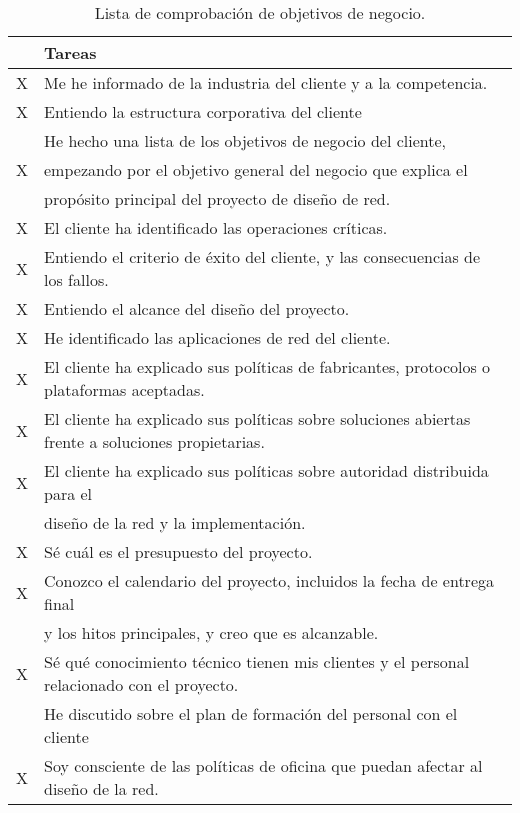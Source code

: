 \begin{table}[H]
	\begin{center}
		\begin{tabular}{|c|l|}
			\hline 
			 & Tareas  \\ 
			\hline \hline
			 X & Me he informado de la industria del cliente y a la competencia.  \\ \hline
			 X & Entiendo la estructura corporativa del cliente  \\ \hline
			  & He hecho una lista de los objetivos de negocio del cliente, \\
			 X & empezando por el objetivo general del negocio que explica el \\ 
			  & propósito principal del proyecto de diseño de red.  \\ \hline
			 X & El cliente ha identificado las operaciones críticas. \\ \hline
			 X & Entiendo el criterio de éxito del cliente, y las consecuencias de los
			 fallos.  \\ \hline
			 X & Entiendo el alcance del diseño del proyecto.  \\ \hline
			 X & He identificado las aplicaciones de red del cliente.  \\ \hline
			 X & El cliente ha explicado sus políticas de fabricantes, protocolos o
			 plataformas aceptadas.  \\ \hline
			 X & El cliente ha explicado sus políticas sobre soluciones abiertas frente a
			 soluciones propietarias.  \\ \hline
			 X & El cliente ha explicado sus políticas sobre autoridad distribuida para el \\
			 & diseño de la red y la implementación.  \\ \hline
			 X & Sé cuál es el presupuesto del proyecto.  \\ \hline
			 X & Conozco el calendario del proyecto, incluidos la fecha de entrega final \\
			 & y los hitos principales, y creo que es alcanzable.  \\ \hline
			 X & Sé qué conocimiento técnico tienen mis clientes y el personal
			 relacionado con el proyecto.  \\ \hline
			  & He discutido sobre el plan de formación del personal con el cliente  \\ \hline
			 X & Soy consciente de las políticas de oficina que puedan afectar al diseño
			 de la red.  \\ \hline
		\end{tabular}
		\caption{Lista de comprobación de objetivos de negocio.}
		\label{tabla:tabla1}
	\end{center}
\end{table}

